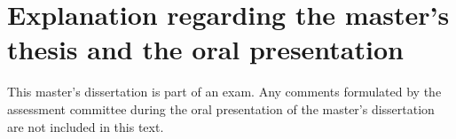 \chapter*{Explanation regarding the master's thesis and the oral presentation}


This master's dissertation is part of an exam. Any comments formulated by the assessment committee during the oral presentation of the master's dissertation are not included in this text.

%
%
